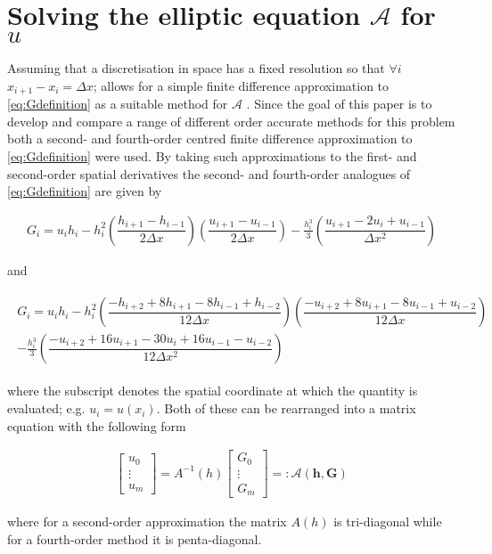 \documentclass[SingleSpace,12pt,Proceedings]{Serre_ASCE}
\begin{document}
\section{Solving the elliptic equation $\mathcal{A}$ for $u$}
Assuming that a discretisation in space has a fixed resolution so that $\forall i$ $x_{i+1} - x_{i} = \Delta x$; allows for a simple finite difference approximation to \eqref{eq:Gdefinition} as a suitable method for $\mathcal{A}$ \cite{Hank-etal-2010-2034,Zoppou-2014}. Since the goal of this paper is to develop and compare a range of different order accurate methods for this problem both a second- and fourth-order centred finite difference approximation to \eqref{eq:Gdefinition} were used. By taking such approximations to the first- and second-order spatial derivatives the second- and fourth-order analogues of \eqref{eq:Gdefinition} are given by
\begin{linenomath*}
\begin{gather*} \tag{5a} \label{eq:Gsecondord}
G_i = u_ih_i - h_i^2 \left(\dfrac{h_{i+1} - h_{i-1}}{2\Delta x}\right) \left(\dfrac{u_{i+1} - u_{i-1}}{2\Delta x}\right) - \frac{h_i^3}{3} \left(\dfrac{u_{i+1} - 2 u_{i} + u_{i-1}}{\Delta x^2}\right)
\end{gather*}
\end{linenomath*}
and
\begin{linenomath*}
\begin{gather*} \tag{5b} \label{eq:Gfourthord}
\begin{split} 
G_i = u_ih_i - h_i^2 \left(\dfrac{-h_{i+2} + 8h_{i+1} - 8h_{i-1} + h_{i-2}}{12\Delta x}\right) \left(\dfrac{-u_{i+2} + 8u_{i+1} - 8u_{i-1} + u_{i-2}}{12\Delta x}\right) \\ - \frac{h_i^3}{3} \left(\dfrac{-u_{i+2} + 16u_{i+1} - 30u_{i} + 16u_{i-1} - u_{i-2}}{12\Delta x^2}\right)&
\end{split}
\end{gather*}
\end{linenomath*}
where the subscript denotes the spatial coordinate at which the quantity is evaluated; e.g. $u_i = u(x_i)$. Both of these can be rearranged into a matrix equation with the following form 
\begin{linenomath*}
\begin{gather*}
\left[\begin{array}{c}
  u_0 \\
  \vdots \\
  u_m \end{array}\right] = A^{-1}\left(h\right)
\left[\begin{array}{c}
 G_0 \\
 \vdots \\
 G_m \end{array}\right] =: \mathcal{A}(\boldsymbol{h},\boldsymbol{G})
\end{gather*}
\end{linenomath*}
where for a second-order approximation the matrix $A(h)$ is tri-diagonal while for a fourth-order method it is penta-diagonal.
\end{document}
